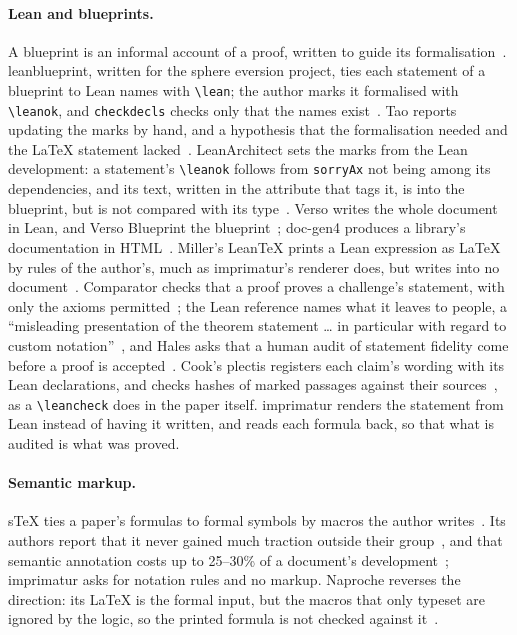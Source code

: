 \documentclass[acmsmall,screen,review,anonymous,nonacm]{acmart}
\begin{document}
\paragraph{Lean and blueprints.} A blueprint is an informal account of a
proof, written to guide its formalisation~\cite{Hales12}. leanblueprint,
written for the sphere eversion project, ties each statement of a
blueprint to Lean names with \verb|\lean|; the author marks it formalised
with \verb|\leanok|, and \texttt{checkdecls} checks only that the names
exist~\cite{VanDoorn23,Massot20}. Tao reports updating the marks by hand,
and a hypothesis that the formalisation needed and the \LaTeX{} statement
lacked~\cite{Tao23}. LeanArchitect sets the marks from the Lean
development: a statement's \verb|\leanok| follows from \texttt{sorryAx} not
being among its dependencies, and its text, written in the attribute that
tags it, is \verb|| into the blueprint, but is not compared with its
type~\cite{Zhu26}. Verso writes the whole document in Lean, and Verso
Blueprint the blueprint~\cite{Christiansen23,GallegoArias26}; doc-gen4
produces a library's documentation in HTML~\cite{Boving21}. Miller's
LeanTeX prints a Lean expression as \LaTeX{} by rules of the author's, much
as imprimatur's renderer does, but writes into no document~\cite{Miller23}.
Comparator checks that a proof proves a challenge's statement, with only
the axioms permitted~\cite{Boving25}; the Lean reference names what it
leaves to people, a ``misleading presentation of the theorem statement
\ldots{} in particular with regard to custom notation''~\cite{LeanFRO26},
and Hales asks that a human audit of statement fidelity come before a
proof is accepted~\cite{Hales26}. Cook's plectis registers each claim's
wording with its Lean declarations, and checks hashes of marked passages
against their sources~\cite{Cook26}, as a \verb|\leancheck| does in the
paper itself. imprimatur renders the statement from Lean instead of having
it written, and reads each formula back, so that what is audited is what
was proved.

\paragraph{Semantic markup.} sTeX ties a paper's formulas to formal symbols
by macros the author writes~\cite{Kohlhase08}. Its authors report that it
never gained much traction outside their group~\cite{Kohlhase21}, and that
semantic annotation costs up to 25--30\% of a document's
development~\cite{Mueller22}; imprimatur asks for notation rules and no
markup. Naproche reverses the direction: its \LaTeX{} is the formal input,
but the macros that only typeset are ignored by the logic, so the printed
formula is not checked against it~\cite{Lichtnau21}.
\end{document}
